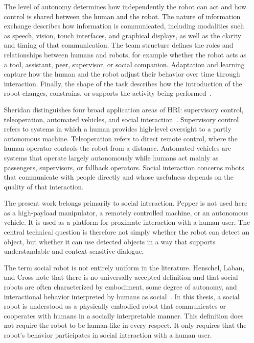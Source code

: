   The level of autonomy determines how independently the robot can act and how control is shared between the human and the robot. The nature of information exchange describes how information is
  communicated, including modalities such as speech, vision, touch interfaces, and graphical displays, as well as the clarity and timing of that communication. The team structure defines the roles and
  relationships between humans and robots, for example whether the robot acts as a tool, assistant, peer, supervisor, or social companion. Adaptation and learning capture how the human and the robot
  adjust their behavior over time through interaction. Finally, the shape of the task describes how the introduction of the robot changes, constrains, or supports the activity being
  performed~\cite[216--232]{goodrich_human-robot_2007}.

  Sheridan distinguishes four broad application areas of HRI: supervisory control, teleoperation, automated vehicles, and social interaction~\cite[525--526]{Sheridan2016HRI}. Supervisory control refers
  to systems in which a human provides high-level oversight to a partly autonomous machine. Teleoperation refers to direct remote control, where the human operator controls the robot from a distance.
  Automated vehicles are systems that operate largely autonomously while humans act mainly as passengers, supervisors, or fallback operators. Social interaction concerns robots that communicate with
  people directly and whose usefulness depends on the quality of that interaction.

  The present work belongs primarily to social interaction. Pepper is not used here as a high-payload manipulator, a remotely controlled machine, or an autonomous vehicle. It is used as a platform for
  proximate interaction with a human user. The central technical question is therefore not simply whether the robot can detect an object, but whether it can use detected objects in a way that supports
  understandable and context-sensitive dialogue.

  The term social robot is not entirely uniform in the literature. Henschel, Laban, and Cross note that there is no universally accepted definition and that social robots are often characterized by
  embodiment, some degree of autonomy, and interactional behavior interpreted by humans as social~\cite[11--12]{henschel_what_2021}. In this thesis, a social robot is understood as a physically embodied
  robot that communicates or cooperates with humans in a socially interpretable manner. This definition does not require the robot to be human-like in every respect. It only requires that the robot's
  behavior participates in social interaction with a human user.


